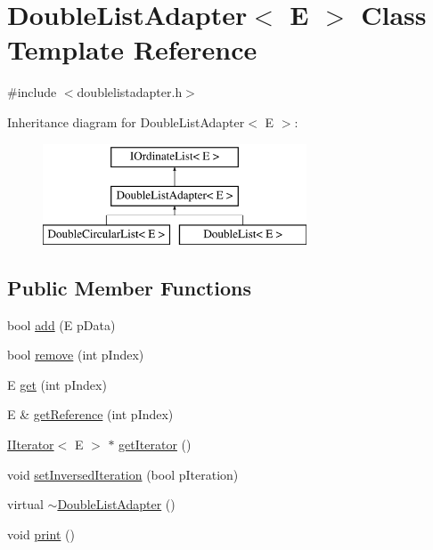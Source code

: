 \hypertarget{class_double_list_adapter}{\section{Double\-List\-Adapter$<$ E $>$ Class Template Reference}
\label{class_double_list_adapter}
}


{\ttfamily \#include $<$doublelistadapter.\-h$>$}

Inheritance diagram for Double\-List\-Adapter$<$ E $>$\-:\begin{figure}[H]
\begin{center}
\leavevmode
\includegraphics[height=3.000000cm]{class_double_list_adapter}
\end{center}
\end{figure}
\subsection*{Public Member Functions}
\begin{DoxyCompactItemize}
\item 
bool \hyperlink{class_double_list_adapter_a6f5bc523f04b3b223f259a72a1975b11}{add} (E p\-Data)
\item 
bool \hyperlink{class_double_list_adapter_a76d83f0f676236b98aa5e555a43a173b}{remove} (int p\-Index)
\item 
E \hyperlink{class_double_list_adapter_a70017142377b23a0f6ec22ac4c01aa6c}{get} (int p\-Index)
\item 
E \& \hyperlink{class_double_list_adapter_ad608ef5f6917c09899b55fc5b20d9b4b}{get\-Reference} (int p\-Index)
\item 
\hyperlink{class_i_iterator}{I\-Iterator}$<$ E $>$ $\ast$ \hyperlink{class_double_list_adapter_a40ba21fc70df64e91bf269bb721d20a9}{get\-Iterator} ()
\item 
void \hyperlink{class_double_list_adapter_a95df61b73f8c9535c8abe227c2207ea9}{set\-Inversed\-Iteration} (bool p\-Iteration)
\item 
virtual \hyperlink{class_double_list_adapter_aeff19b80530a522fadcea251abc63ea6}{$\sim$\-Double\-List\-Adapter} ()
\item 
void \hyperlink{class_double_list_adapter_a7f67c49e4d93576b9ccbf3578904df30}{print} ()
\end{DoxyCompactItemize}
